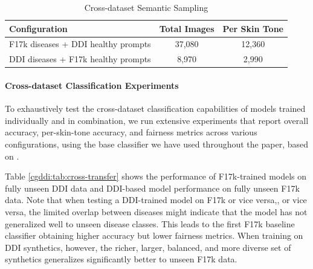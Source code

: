\documentclass[11pt]{ucthesis}
\begin{document}
\begin{table}[h]
\centering
\caption{Cross-dataset Semantic Sampling}
\label{cgddi:tab:cross-semantic}
\begin{tabular}{lcc}
\toprule
\textbf{Configuration} & \textbf{Total Images} & \textbf{Per Skin Tone} \\
\midrule
F17k diseases + DDI healthy prompts & 37,080 & 12,360 \\
DDI diseases + F17k healthy prompts & 8,970 & 2,990 \\
\bottomrule
\end{tabular}
\end{table}

\paragraph{Cross-dataset Classification Experiments}
To exhaustively test the cross-dataset classification capabilities of models trained individually and in combination, we run extensive experiments that report overall accuracy, per-skin-tone accuracy, and fairness metrics across various configurations, using the base classifier we have used throughout the paper, based on \cite{aayushman-2024}.

Table \ref{cgddi:tab:cross-transfer} shows the performance of F17k-trained models on fully unseen DDI data and DDI-based model performance on fully unseen F17k data. Note that when testing a DDI-trained model on F17k or vice versa,, or vice versa, the limited overlap between diseases might indicate that the model has not generalized well to unseen disease classes. This leads to the first F17k baseline classifier obtaining higher accuracy but lower fairness metrics. When training on DDI synthetics, however, the richer, larger, balanced, and more diverse set of synthetics generalizes significantly better to unseen F17k data.
\end{document}
